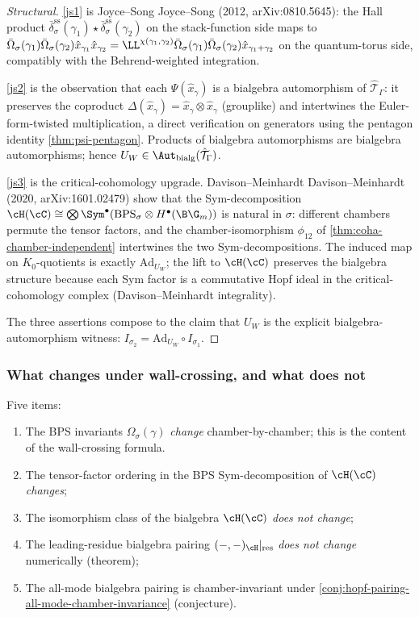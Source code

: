 \begin{proof}[Structural]
 \ref{js1} is Joyce--Song Joyce--Song (2012, arXiv:0810.5645): the Hall product
 $\bar{\delta}_\sigma^{\mathrm{ss}}(\gamma_1) \star \bar{\delta}_\sigma^{\mathrm{ss}}(\gamma_2)$
 on the stack-function side maps to
 $\bar{\Omega}_\sigma(\gamma_1) \bar{\Omega}_\sigma(\gamma_2) \hat{x}_{\gamma_1} \hat{x}_{\gamma_2}
 = \LL^{\chi(\gamma_1, \gamma_2)} \bar{\Omega}_\sigma(\gamma_1) \bar{\Omega}_\sigma(\gamma_2) \hat{x}_{\gamma_1 + \gamma_2}$
 on the quantum-torus side, compatibly with the Behrend-weighted integration.

 \ref{js2} is the observation that each $\Psi(\hat{x}_\gamma)$ is a bialgebra
 automorphism of $\hat{\mathcal{T}}_\Gamma$: it preserves the coproduct
 $\Delta(\hat{x}_\gamma) = \hat{x}_\gamma \otimes \hat{x}_\gamma$ (grouplike) and
 intertwines the Euler-form-twisted multiplication, a direct
 verification on generators using the pentagon identity
 \cref{thm:psi-pentagon}. Products of bialgebra automorphisms are
 bialgebra automorphisms; hence $U_W \in \Aut_{\mathrm{bialg}}(\hat{\mathcal{T}}_\Gamma)$.

 \ref{js3} is the critical-cohomology upgrade. Davison--Meinhardt
 Davison--Meinhardt (2020, arXiv:1601.02479) show that the Sym-decomposition
 $\cH(\cC) \cong \bigotimes \Sym^\bullet(\mathrm{BPS}_\sigma \otimes H^\bullet(\B\G_m))$
 is natural in $\sigma$: different chambers permute the tensor factors,
 and the chamber-isomorphism $\phi_{12}$ of
 \cref{thm:coha-chamber-independent} intertwines the two
 Sym-decompositions. The induced map on $K_0$-quotients is exactly
 $\mathrm{Ad}_{U_W}$; the lift to $\cH(\cC)$ preserves the bialgebra
 structure because each Sym factor is a commutative Hopf ideal in the
 critical-cohomology complex (Davison--Meinhardt integrality).

 The three assertions compose to the claim that $U_W$ is the explicit
 bialgebra-automorphism witness: $I_{\sigma_2} = \mathrm{Ad}_{U_W} \circ I_{\sigma_1}$.
\end{proof}

\subsubsection{What changes under wall-crossing, and what does not}

Five items:

\begin{enumerate}[leftmargin=2em]
 \item The BPS invariants $\Omega_\sigma(\gamma)$ \emph{change} chamber-by-chamber;
 this is the content of the wall-crossing formula.
 \item The tensor-factor ordering in the BPS Sym-decomposition of
 $\cH(\cC)$ \emph{changes};
 \item The isomorphism class of the bialgebra $\cH(\cC)$ \emph{does not change};
 \item The leading-residue bialgebra pairing $(-, -)_\cH|_{\mathrm{res}}$
 \emph{does not change} numerically (theorem);
 \item The all-mode bialgebra pairing is chamber-invariant under
 \cref{conj:hopf-pairing-all-mode-chamber-invariance}
 (conjecture).
\end{enumerate}

